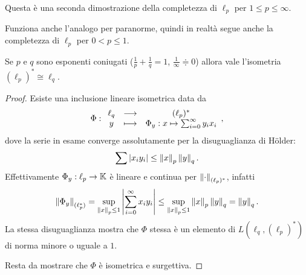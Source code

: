 \begin{remark}
Questa \`e una seconda dimostrazione della completezza di $\ell_p$ per $1\leq p\leq \infty$.
\end{remark}

\begin{remark}
Funziona anche l'analogo per paranorme, quindi in realt\`a segue anche la completezza di $\ell_p$ per $0<p\leq 1$.
\end{remark}

\begin{proposition}\label{PrDualilp}
Se $p$ e $q$ sono esponenti coniugati ($\frac1p+\frac1q=1$, $\frac1\infty\doteqdot 0$) allora vale l'isometria $(\ell_p)^\ast\cong \ell_q$.
\end{proposition}
\begin{proof}
Esiste una inclusione lineare isometrica data da
\[\Phi:\begin{array}{ccc} {\ell_q} & \longrightarrow & {(\ell_p)^\ast}\\ {y} & \longmapsto & {\Phi_y: x\mapsto \sum_{i=0}^\infty y_ix_i} \end{array},\]
dove la serie in esame converge assolutamente per la disuguaglianza di H\"older:
\[\sum\left|{x_iy_i}\right|\leq \left\Vert{x}\right\Vert_p\left\Vert{y}\right\Vert_q.\]
Effettivamente $\Phi_y:\ell_p\to \mathbb{K}$ \`e lineare e continua per $\left\Vert{\cdot}\right\Vert_{(\ell_p)^\ast}$, infatti
\[\left\Vert{\Phi_y}\right\Vert_{(\ell_p^\ast)}=\sup_{\left\Vert{x}\right\Vert_p\leq 1}\left|{\sum_{i=0}^\infty x_iy_i}\right|\leq \sup_{\left\Vert{x}\right\Vert_p\leq 1}\left\Vert{x}\right\Vert_p\left\Vert{y}\right\Vert_q=\left\Vert{y}\right\Vert_q.\]
La stessa disuguaglianza mostra che $\Phi$ stessa \`e un elemento di $L(\ell_q,(\ell_p)^\ast)$ di norma minore o uguale a $1$.

Resta da mostrare che $\Phi$ \`e isometrica e surgettiva.


\end{proof}
